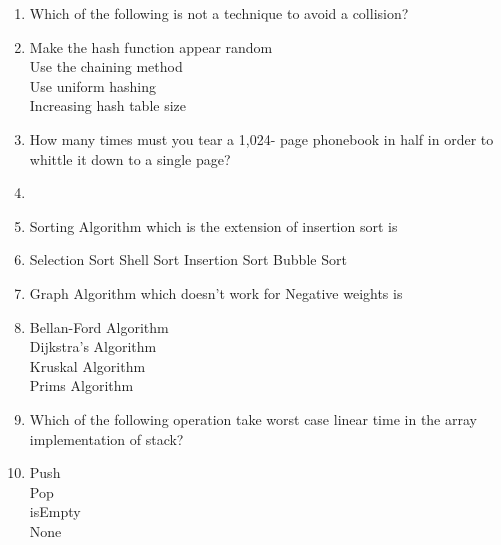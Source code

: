 \documentclass[12pt ,a4paper]{exam}
\begin{document}
\begin{enumerate}[start=1,label={\bfseries Q\arabic*)}]
		\item Which of the following is not a technique to avoid a collision?
	\item[] 
	\begin{oneparchoices}
		\choice  Make the hash function appear random\\%
		\choice Use the chaining method\\
		\choice Use uniform hashing\\
		\choice Increasing hash table size \checkmark
	\end{oneparchoices}
 	 \item How many times must you tear a 1,024- page phonebook in half in order to whittle it down to a single page?
 	 	\item[] 
 	 \begin{oneparchoices}
 	 	 \checkmark
 	 	\choice 32
 	 	\choice 512
 	 \end{oneparchoices}
      \item Sorting Algorithm which is the extension of insertion sort is
      \item[] 
      \begin{oneparchoices}
      	\choice Selection Sort%
      	\choice Shell Sort\checkmark
      	\choice Insertion Sort
      	\choice Bubble Sort
      \end{oneparchoices}
  
     \item Graph Algorithm which doesn't work for Negative weights is
     \item[] 
     \begin{oneparchoices}
     	\choice Bellan-Ford Algorithm\\%
     	\choice Dijkstra's Algorithm \checkmark\\
     	\choice Kruskal Algorithm\\
     	\choice Prims Algorithm
     \end{oneparchoices}
 
     \item Which of the following operation take worst case linear time in the array implementation of stack?
     \item[] 
     \begin{oneparchoices}
     	\choice Push\\%
     	\choice Pop\\
     	\choice isEmpty\\
     	\choice None \checkmark\\
     \end{oneparchoices}
    

\end{enumerate}
\end{document}
